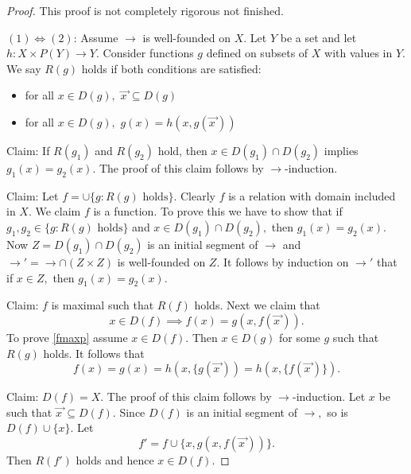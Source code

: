 \documentclass[
  letterpaper,
  10pt,
  reqno,
  twopage,
  openany]{book}
\providecommand{\tightlist}{%
  \setlength{\itemsep}{0pt}\setlength{\parskip}{0pt}}\usepackage{longtable,booktabs,array}
\theoremstyle{plain}
\theoremstyle{definition}
\theoremstyle{definition}
\theoremstyle{definition}
\theoremstyle{plain}
\theoremstyle{plain}
\theoremstyle{remark}
\begin{document}
\begin{proof}

This proof is not completely rigorous not finished.

\((1)\Leftrightarrow(2)\): Assume \(\longrightarrow\) is well-founded on
\(X.\) Let \(Y\) be a set and let \(h:X\times P(Y)\to Y.\) Consider
functions \(g\) defined on subsets of \(X\) with values in \(Y.\) We say
\(R(g)\) holds if both conditions are satisfied:

\begin{itemize}
\tightlist
\item
  for all \(x\in D(g),\) \(\overrightarrow{x\,} \subseteq D(g)\)
\item
  for all \(x\in D(g),\) \(g(x)=h(x,g(\overrightarrow{x\,}))\)
\end{itemize}

Claim: If \(R(g_1)\) and \(R(g_2)\) hold, then
\(x\in D(g_1)\cap D(g_2)\) implies \(g_1(x)=g_2(x).\) The proof of this
claim follows by \(\longrightarrow\)-induction.

Claim: Let \(f=\cup \{g : R(g) \text{ holds}\}.\) Clearly \(f\) is a
relation with domain included in \(X.\) We claim \(f\) is a function. To
prove this we have to show that if
\(g_1,g_2\in \{g : R(g) \text{ holds}\}\) and
\(x\in D(g_1)\cap D(g_2),\) then \(g_1(x)=g_2(x).\) Now
\(Z=D(g_1)\cap D(g_2)\) is an initial segment of \(\longrightarrow\) and
\(\longrightarrow'=\longrightarrow\cap(Z\times Z)\) is well-founded on
\(Z.\) It follows by induction on \(\longrightarrow'\) that if
\(x\in Z,\) then \(g_1(x)=g_2(x).\)

Claim: \(f\) is maximal such that \(R(f)\) holds. Next we claim that
\begin{equation}
\label{fmaxp}
x\in D(f) \implies f(x)=g(x,f(\overrightarrow{x\,})).
\end{equation} To prove \eqref{fmaxp} assume \(x\in D(f).\) Then
\(x\in D(g)\) for some \(g\) such that \(R(g)\) holds. It follows that
\[
f(x)=g(x)=h(x,\{g(\overrightarrow{x\,}))=h(x,\{f(\overrightarrow{x\,})\}).
\]

Claim: \(D(f)=X.\) The proof of this claim follows by
\(\longrightarrow\)-induction. Let \(x\) be such that
\(\overrightarrow{x\,}\subseteq D(f).\) Since \(D(f)\) is an initial
segment of \(\longrightarrow,\) so is \(D(f)\cup \{x\}.\) Let \[
f'=f\cup \{x,g(x,f(\overrightarrow{x\,}))\}.
\] Then \(R(f')\) holds and hence \(x\in D(f).\)


\end{proof}
\end{document}
